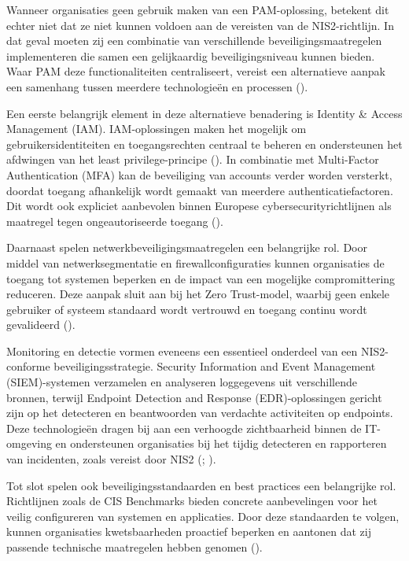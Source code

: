 Wanneer organisaties geen gebruik maken van een PAM-oplossing, betekent dit echter niet dat ze niet kunnen voldoen aan de vereisten van de NIS2-richtlijn. In dat geval moeten zij een combinatie van verschillende beveiligingsmaatregelen implementeren die samen een gelijkaardig beveiligingsniveau kunnen bieden. Waar PAM deze functionaliteiten centraliseert, vereist een alternatieve aanpak een samenhang tussen meerdere technologieën en processen (\cite{enisa2023}).

Een eerste belangrijk element in deze alternatieve benadering is Identity & Access Management (IAM). IAM-oplossingen maken het mogelijk om gebruikersidentiteiten en toegangsrechten centraal te beheren en ondersteunen het afdwingen van het least privilege-principe (\cite{nist2020}). In combinatie met Multi-Factor Authentication (MFA) kan de beveiliging van accounts verder worden versterkt, doordat toegang afhankelijk wordt gemaakt van meerdere authenticatiefactoren. Dit wordt ook expliciet aanbevolen binnen Europese cybersecurityrichtlijnen als maatregel tegen ongeautoriseerde toegang (\cite{enisa2023}).

Daarnaast spelen netwerkbeveiligingsmaatregelen een belangrijke rol. Door middel van netwerksegmentatie en firewallconfiguraties kunnen organisaties de toegang tot systemen beperken en de impact van een mogelijke compromittering reduceren. Deze aanpak sluit aan bij het Zero Trust-model, waarbij geen enkele gebruiker of systeem standaard wordt vertrouwd en toegang continu wordt gevalideerd (\cite{nist2020}).

Monitoring en detectie vormen eveneens een essentieel onderdeel van een NIS2-conforme beveiligingsstrategie. Security Information and Event Management (SIEM)-systemen verzamelen en analyseren loggegevens uit verschillende bronnen, terwijl Endpoint Detection and Response (EDR)-oplossingen gericht zijn op het detecteren en beantwoorden van verdachte activiteiten op endpoints. Deze technologieën dragen bij aan een verhoogde zichtbaarheid binnen de IT-omgeving en ondersteunen organisaties bij het tijdig detecteren en rapporteren van incidenten, zoals vereist door NIS2 (\cite{enisa2023}; \cite{microsoft2024}).

Tot slot spelen ook beveiligingsstandaarden en best practices een belangrijke rol. Richtlijnen zoals de CIS Benchmarks bieden concrete aanbevelingen voor het veilig configureren van systemen en applicaties. Door deze standaarden te volgen, kunnen organisaties kwetsbaarheden proactief beperken en aantonen dat zij passende technische maatregelen hebben genomen (\cite{cis2024}).

